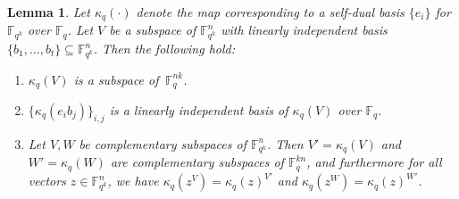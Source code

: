 \documentclass[11pt]{article}
\newtheorem{lemma}[theorem]{Lemma}
\theoremstyle{definition}
\newcommand{\F}{\ensuremath{\mathbb{F}}}
\newcommand{\downsize}{\kappa}
\begin{document}
\begin{lemma}
  \label{lem:downsize_subspace}
  Let $\downsize_q(\cdot)$ denote the map corresponding to a self-dual basis
  $\{e_i\}$ for $\F_{q^k}$ over $\F_q$.
  Let $V$ be a subspace of $\F_{q^k}^n$ with linearly independent basis $\{b_1,\ldots,b_t\}
  \subseteq \F_{q^k}^n$.
  Then the following hold:
  \begin{enumerate}
 	\item $\downsize_q(V)$ is a subspace of $\,\F_{q}^{nk}$.
	\item $\{ \downsize_q(e_i b_j) \}_{i,j}$ is a linearly independent basis of
    $\downsize_q(V)$ over $\F_q$.
	\item Let $V, W$ be complementary subspaces of $\F_{q^k}^n$.
    Then $V' = \downsize_q(V)$ and $W' = \downsize_q(W)$ are complementary
    subspaces of $\F_q^{kn}$, and furthermore for all vectors $z \in
    \F_{q^k}^n$, we have $\downsize_q(z^V) = \downsize_q(z)^{V'}$ and
    $\downsize_q(z^W) = \downsize_q(z)^{W'}$.
  \end{enumerate}
\end{lemma}
\end{document}
